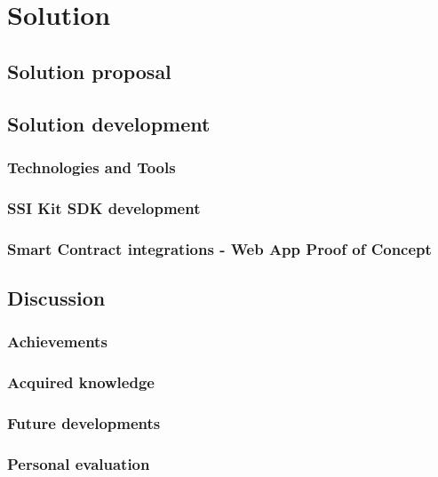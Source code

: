 
\chapter{Solution}

\section{Solution proposal}

\section{Solution development}
\subsection{Technologies and Tools}
\subsection{SSI Kit SDK development}
\subsection{Smart Contract integrations - Web App Proof of Concept}

\section{Discussion}
\subsection{Achievements}
\subsection{Acquired knowledge}
\subsection{Future developments}
\subsection{Personal evaluation}
